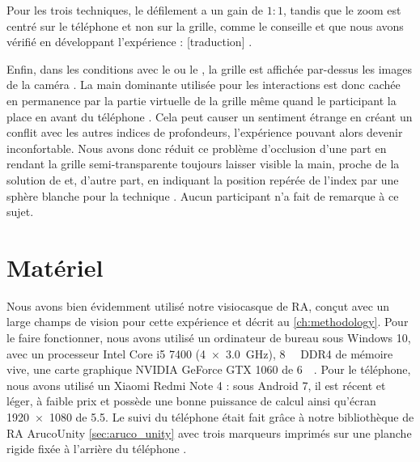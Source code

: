 
Pour les trois techniques, le défilement a un gain de $1:1$, tandis que le zoom est centré sur le téléphone et non sur la grille, comme le conseille \cite{Guiard2004} et que nous avons vérifié en développant l'expérience : [traduction] .

Enfin, dans les conditions avec le  ou le , la grille est affichée par-dessus les images de la caméra . La main dominante utilisée pour les interactions est donc cachée en permanence par la partie virtuelle de la grille même quand le participant la place en avant du téléphone . Cela peut causer un sentiment étrange en créant un conflit avec les autres indices de profondeurs, l'expérience pouvant alors devenir inconfortable. Nous avons donc réduit ce problème d'occlusion d'une part en rendant la grille semi-transparente toujours laisser visible la main, proche de la solution de \cite{Piumsomboon2014} et, d'autre part, en indiquant la position repérée de l'index par une sphère blanche pour la technique . Aucun participant n'a fait de remarque à ce sujet.


\section{Matériel}
\label{sec:experiment_material}

Nous avons bien évidemment utilisé notre visiocasque de RA, conçut avec un large champs de vision pour cette expérience et décrit au \autoref{ch:methodology}. Pour le faire fonctionner, nous avons utilisé un ordinateur de bureau sous Windows 10, avec un processeur Intel Core i5 7400 (\SI[product-units = single]{4x3.0}{\GHz}), \SI{8}{\giga\byte} DDR4 de mémoire vive, une carte graphique NVIDIA GeForce GTX 1060 de \SI{6}{\giga\byte}. Pour le téléphone, nous avons utilisé un Xiaomi Redmi Note 4 : sous Android 7, il est récent et léger, à faible prix et possède une bonne puissance de calcul ainsi qu'écran \SI{1920x1080}{\px} de \SI{5.5}{\inch}. Le suivi du téléphone était fait grâce à notre bibliothèque de RA ArucoUnity \autoref{sec:aruco_unity} avec trois marqueurs imprimés sur une planche rigide fixée à l'arrière du téléphone .

